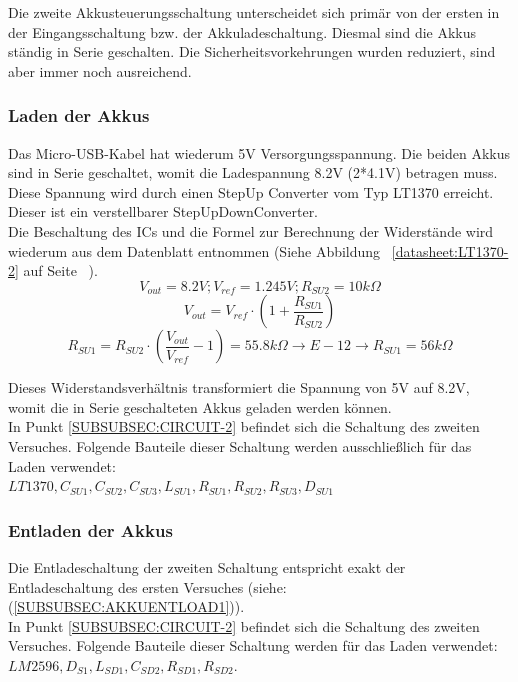 \documentclass[12pt,a4paper]{article}
\begin{document}
{Die zweite Akkusteuerungsschaltung unterscheidet sich primär von der ersten in der Eingangsschaltung bzw. der Akkuladeschaltung. Diesmal sind die Akkus ständig in Serie geschalten. Die Sicherheitsvorkehrungen wurden reduziert, sind aber immer noch ausreichend.

\subsubsection{Laden der Akkus}
\label{SUBSUBSEC:AKKULOAD2}

Das Micro-USB-Kabel hat wiederum 5V Versorgungsspannung. Die beiden Akkus sind in Serie geschaltet, womit die Ladespannung 8.2V (2*4.1V) betragen muss. Diese Spannung wird durch einen StepUp Converter vom Typ LT1370 erreicht. Dieser ist ein verstellbarer StepUpDownConverter. \\
Die Beschaltung des ICs und die Formel zur Berechnung der Widerstände wird wiederum aus dem Datenblatt entnommen (Siehe Abbildung ~\ref{datasheet:LT1370-2} auf Seite ~\pageref{datasheet:LT1370-2}). \\
\[V_{out}=8.2V;V_{ref}=1.245V;R_{SU2}=10k\Omega\]
\[V_{out}=V_{ref} \cdot \left( 1 + \frac{R_{SU1}}{R_{SU2}} \right)\]
\[R_{SU1} = R_{SU2} \cdot \left( \frac{V_{out}}{V_{ref}} - 1 \right) = 55.8 k\Omega \rightarrow E-12 \rightarrow R_{SU1} = 56 k \Omega\]

\vspace{1cm}
Dieses Widerstandsverhältnis transformiert die Spannung von 5V auf 8.2V, womit die in Serie geschalteten Akkus geladen werden können.  \\
In Punkt \ref{SUBSUBSEC:CIRCUIT-2} befindet sich die Schaltung des zweiten Versuches. Folgende Bauteile dieser Schaltung werden ausschließlich für das Laden verwendet:\\ $LT1370,C_{SU1},C_{SU2},C_{SU3}, L_{SU1},R_{SU1},R_{SU2},R_{SU3},D_{SU1}$ 

\subsubsection{Entladen der Akkus}
\label{SUBSUBSEC:AKKUENTLOAD2}

Die Entladeschaltung der zweiten Schaltung entspricht exakt der Entladeschaltung des ersten Versuches (siehe:  (\ref{SUBSUBSEC:AKKUENTLOAD1})).\\
In Punkt \ref{SUBSUBSEC:CIRCUIT-2} befindet sich die Schaltung des zweiten Versuches. Folgende Bauteile dieser Schaltung werden für das Laden verwendet:\\ $LM2596,D_{S1},L_{SD1},C_{SD2},R_{SD1},R_{SD2}$. 
\newpage

}
\end{document}
